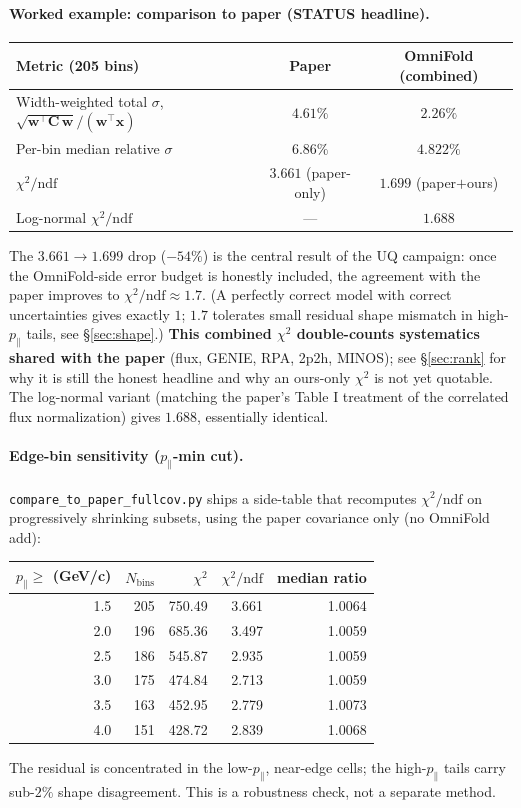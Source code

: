 \documentclass[12pt]{article}
\newcommand{\pPar}{p_{\parallel}}
\newcommand{\T}{^{\!\top}}
\begin{document}
\paragraph{Worked example: comparison to paper (STATUS headline).}
\begin{center}
\begin{tabular}{@{}lcc@{}}
\toprule
Metric (205 bins) & Paper & OmniFold (combined) \\
\midrule
Width-weighted total $\sigma$, $\sqrt{\mathbf{w}\T\mathbf{C}\,\mathbf{w}}/(\mathbf{w}\T\mathbf{x})$ & $4.61\%$ & $2.26\%$ \\
Per-bin median relative $\sigma$ & $6.86\%$ & $4.822\%$ \\
$\chi^{2}/\mathrm{ndf}$ & $3.661$ (paper-only) & $\boxed{1.699}$ (paper$+$ours) \\
Log-normal $\chi^{2}/\mathrm{ndf}$ & --- & $1.688$ \\
\bottomrule
\end{tabular}
\end{center}
The $3.661 \to 1.699$ drop ($-54\%$) is the central result of the UQ
campaign: once the OmniFold-side error budget is honestly included,
the agreement with the paper improves to $\chi^{2}/\mathrm{ndf}
\approx 1.7$. (A perfectly correct model with correct uncertainties
gives exactly $1$; $1.7$ tolerates small residual shape mismatch in
high-$\pPar$ tails, see \S\ref{sec:shape}.) \textbf{This combined
$\chi^{2}$ double-counts systematics shared with the paper} (flux,
GENIE, RPA, 2p2h, MINOS); see \S\ref{sec:rank} for why it is still the
honest headline and why an ours-only $\chi^{2}$ is not yet quotable.
The log-normal variant (matching the paper's Table I treatment of the
correlated flux normalization) gives $1.688$, essentially identical.

\paragraph{Edge-bin sensitivity ($\pPar$-min cut).}
\texttt{compare\_to\_paper\_fullcov.py} ships a side-table that
recomputes $\chi^{2}/\mathrm{ndf}$ on progressively shrinking subsets,
using the paper covariance only (no OmniFold add):
\begin{center}
\begin{tabular}{@{}rrrrr@{}}
\toprule
$\pPar \ge$ (GeV/c) & $N_{\text{bins}}$ & $\chi^{2}$ & $\chi^{2}/\mathrm{ndf}$ & median ratio \\
\midrule
1.5 & 205 & 750.49 & 3.661 & 1.0064 \\
2.0 & 196 & 685.36 & 3.497 & 1.0059 \\
2.5 & 186 & 545.87 & 2.935 & 1.0059 \\
3.0 & 175 & 474.84 & 2.713 & 1.0059 \\
3.5 & 163 & 452.95 & 2.779 & 1.0073 \\
4.0 & 151 & 428.72 & 2.839 & 1.0068 \\
\bottomrule
\end{tabular}
\end{center}
The residual is concentrated in the low-$\pPar$, near-edge cells; the
high-$\pPar$ tails carry sub-$2\%$ shape disagreement. This is a
robustness check, not a separate method.
\end{document}

